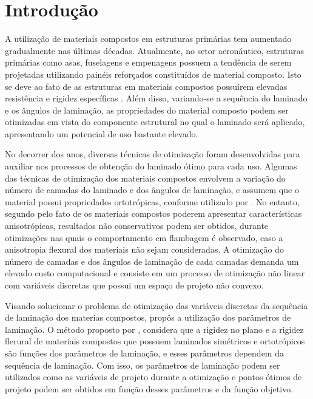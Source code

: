 \chapter[Introdução]{Introdução}

A utilização de materiais compostos em estruturas primárias tem aumentado gradualmente nas últimas décadas. Atualmente, no setor aeronáutico, estruturas primárias como asas, fuselagens e empenagens possuem a tendência de serem projetadas utilizando painéis reforçados constituídos de material composto. Isto se deve ao fato de as estruturas em materiais compostos possuírem elevadas resistência e rigidez específicas \cite{herencia2007optimization}. Além disso, variando-se a sequência do laminado e os ângulos de laminação, as propriedades do material composto podem ser otimizadas em vista do componente estrutural no qual o laminado será aplicado, apresentando um potencial de uso bastante elevado.

No decorrer dos anos, diversas técnicas de otimização foram desenvolvidas para auxiliar nos processos de obtenção do laminado ótimo para cada uso. Algumas das técnicas de otimização dos materiais compostos envolvem a variação do número de camadas do laminado e dos ângulos de laminação, e assumem que o material possui propriedades ortotrópicas, conforme utilizado por \cite{schmit1973optimum}. No entanto, segundo \cite{chamis1969buckling} pelo fato de os materiais compostos poderem apresentar características anisotrópicas, resultados não conservativos podem ser obtidos, durante otimizações nas quais o comportamento em flambagem é observado, caso a anisotropia flexural dos materiais não sejam consideradas. A otimização do número de camadas e dos ângulos de laminação de cada camadas demanda um elevado custo computacional e consiste em um processo de otimização não linear com variáveis discretas que possui um espaço de projeto não convexo.

Visando solucionar o problema de otimização das variáveis discretas da sequência de laminação dos materias compostos, \cite{miki1991optimum} propôs a utilização dos parâmetros de laminação. O método proposto por \cite{miki1991optimum}, considera que a rigidez no plano e a rigidez flerural de materiais compostos que possuem laminados simétricos e ortotrópicos são funções dos parâmetros de laminação, e esses parâmetros dependem da sequência de laminação. Com isso, os parâmetros de laminação podem ser utilizados como as variáveis de projeto durante a otimização e pontos ótimos de projeto podem ser obtidos em função desses parâmetros e da função objetivo.

